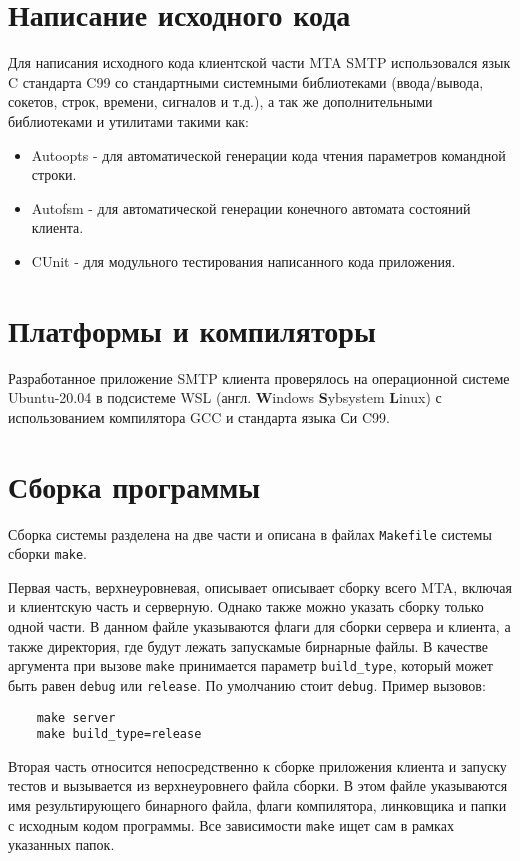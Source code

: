 \documentclass[a4paper,12pt]{report}
\begin{document}
\section{Написание исходного кода}

Для написания исходного кода клиентской части MTA SMTP использовался язык C стандарта C99 со стандартными системными библиотеками (ввода/вывода, сокетов, строк, времени, сигналов и т.д.), а так же дополнительными библиотеками и утилитами такими как:
\begin{itemize}
    \item Autoopts - для автоматической генерации кода чтения параметров командной строки.
    \item Autofsm - для автоматической генерации конечного автомата состояний клиента.
    \item CUnit - для модульного тестирования написанного кода приложения.
\end{itemize}


\section{Платформы и компиляторы}

Разработанное приложение SMTP клиента проверялось на операционной системе Ubuntu-20.04 в подсистеме WSL (англ. \textbf{W}indows \textbf{S}ybsystem \textbf{L}inux) с использованием компилятора GCC и стандарта языка Си C99.


\section{Сборка программы}

Сборка системы разделена на две части и описана в файлах \texttt{Makefile} системы сборки \texttt{make}.

Первая часть, верхнеуровневая, описывает описывает сборку всего MTA, включая и клиентскую часть и серверную. Однако также можно указать сборку только одной части. В данном файле указываются флаги для сборки сервера и клиента, а также директория, где будут лежать запускамые бирнарные файлы. В качестве аргумента при вызове \texttt{make} принимается параметр \texttt{build\_type}, который может быть равен \texttt{debug} или \texttt{release}. По умолчанию стоит \texttt{debug}. Пример вызовов:
\begin{verbatim}
    make server
    make build_type=release
\end{verbatim}

Вторая часть относится непосредственно к сборке приложения клиента и запуску тестов и вызывается из верхнеуровнего файла сборки. В этом файле указываются имя результирующего бинарного файла, флаги компилятора, линковщика и папки с исходным кодом программы. Все зависимости \texttt{make} ищет сам в рамках указанных папок.
\end{document}
